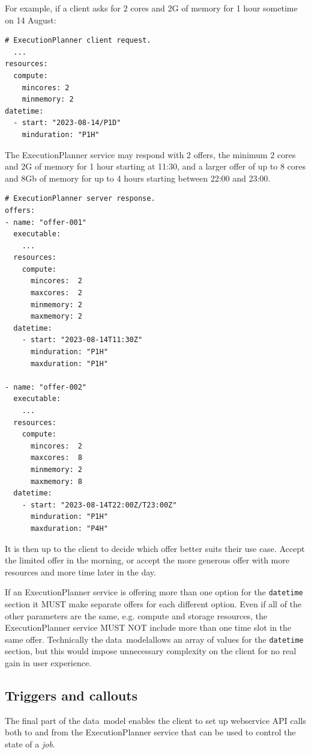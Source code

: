 \documentclass[11pt,a4paper]{ivoa}
\newcommand{\datamodel} {data~model}
\newcommand{\webservice} {webservice}
\newcommand{\execplanner} {ExecutionPlanner}
\newcommand{\codeword}[1] {\texttt{#1}}
\newcommand{\job} {\textit{job}}
\begin{document}
For example, if a client asks for 2 cores and 2G of memory for 1 hour sometime on 14 August:
\begin{lstlisting}[]
# ExecutionPlanner client request.
  ...
resources:
  compute:
    mincores: 2
    minmemory: 2
datetime:
  - start: "2023-08-14/P1D"
    minduration: "P1H"
\end{lstlisting}

The  \execplanner{} service may respond with 2 offers,
the minimum 2 cores and 2G of memory for 1 hour starting at 11:30,
and a larger offer of up to 8 cores and 8Gb of memory for up to 4 hours
starting between 22:00 and 23:00.

\begin{lstlisting}[]
# ExecutionPlanner server response.
offers:
- name: "offer-001"
  executable:
    ...
  resources:
    compute:
      mincores:  2
      maxcores:  2
      minmemory: 2
      maxmemory: 2
  datetime:
    - start: "2023-08-14T11:30Z"
      minduration: "P1H"
      maxduration: "P1H"

- name: "offer-002"
  executable:
    ...
  resources:
    compute:
      mincores:  2
      maxcores:  8
      minmemory: 2
      maxmemory: 8
  datetime:
    - start: "2023-08-14T22:00Z/T23:00Z"
      minduration: "P1H"
      maxduration: "P4H"
\end{lstlisting}

It is then up to the client to decide which offer better suits their use case.
Accept the limited offer in the morning, or accept the more generous offer with
more resources and more time later in the day.

If an \execplanner{} service is offering more than one option for the \codeword{datetime}
section it MUST make separate offers for each different option.
Even if all of the other parameters are the same, e.g. compute and storage resources, the
\execplanner{} service MUST NOT include more than one time slot in the same offer.
Technically the \datamodel allows an array of values for the \codeword{datetime} section,
but this would impose unnecessary complexity on the client for no real gain in user experience.

\subsection{Triggers and callouts}
\label{triggers-callouts}

The final part of the \datamodel{} enables the client to set up
\webservice{} API calls both to and from the \execplanner{} service
that can be used to control the state of a \job{}.
\end{document}

